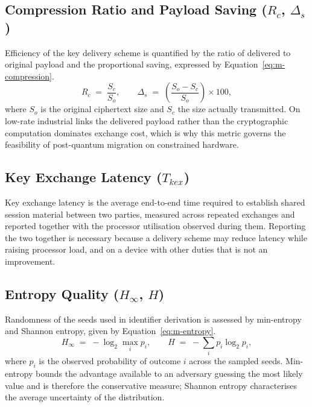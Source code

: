 \subsection{Compression Ratio and Payload Saving ($R_{c}$, $\Delta_{s}$)}
\label{sec:metric-compression}

Efficiency of the key delivery scheme is quantified by the ratio of delivered to original payload and the proportional saving, expressed by Equation~\eqref{eq:m-compression}.
\begin{equation}
\label{eq:m-compression}
R_{c} \;=\; \frac{S_{c}}{S_{o}} , \qquad
\Delta_{s} \;=\; \left( \frac{S_{o} - S_{c}}{S_{o}} \right) \times 100 ,
\end{equation}
where $S_{o}$ is the original ciphertext size and $S_{c}$ the size actually transmitted. On low-rate industrial links the delivered payload rather than the cryptographic computation dominates exchange cost, which is why this metric governs the feasibility of post-quantum migration on constrained hardware.

\subsection{Key Exchange Latency ($T_{kex}$)}
\label{sec:metric-kex}

Key exchange latency is the average end-to-end time required to establish shared session material between two parties, measured across repeated exchanges and reported together with the processor utilisation observed during them. Reporting the two together is necessary because a delivery scheme may reduce latency while raising processor load, and on a device with other duties that is not an improvement.

\subsection{Entropy Quality ($H_{\infty}$, $H$)}
\label{sec:metric-entropy}

Randomness of the seeds used in identifier derivation is assessed by min-entropy and Shannon entropy, given by Equation~\eqref{eq:m-entropy}.
\begin{equation}
\label{eq:m-entropy}
H_{\infty} \;=\; -\log_2 \max_i p_i , \qquad
H \;=\; -\sum_i p_i \log_2 p_i ,
\end{equation}
where $p_i$ is the observed probability of outcome $i$ across the sampled seeds. Min-entropy bounds the advantage available to an adversary guessing the most likely value and is therefore the conservative measure; Shannon entropy characterises the average uncertainty of the distribution.

